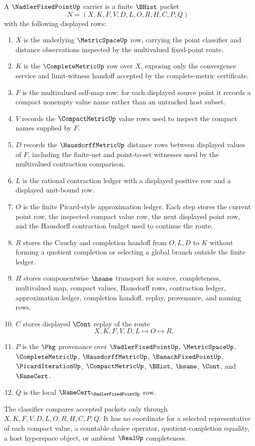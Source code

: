 \begin{definition}\label{def:nadler-fixed-point-carrier}
A $\NadlerFixedPointUp$ carrier is a finite $\BHist$ packet
$$
N=(X,K,F,V,D,L,O,R,H,C,P,Q)
$$
with the following displayed rows:
\begin{enumerate}
\item $X$ is the underlying $\MetricSpaceUp$ row, carrying the point classifier and distance observations inspected by the multivalued fixed-point route.
\item $K$ is the $\CompleteMetricUp$ row over $X$, exposing only the convergence service and limit-witness handoff accepted by the complete-metric certificate.
\item $F$ is the multivalued self-map row: for each displayed source point it records a compact nonempty value name rather than an untracked host subset.
\item $V$ records the $\CompactMetricUp$ value rows used to inspect the compact names supplied by $F$.
\item $D$ records the $\HausdorffMetricUp$ distance rows between displayed values of $F$, including the finite-net and point-to-set witnesses used by the multivalued contraction comparison.
\item $L$ is the rational contraction ledger with a displayed positive row and a displayed unit-bound row.
\item $O$ is the finite Picard-style approximation ledger. Each step stores the current point row, the inspected compact value row, the next displayed point row, and the Hausdorff contraction budget used to continue the route.
\item $R$ stores the Cauchy and completion handoff from $O,L,D$ to $K$ without forming a quotient completion or selecting a global branch outside the finite ledger.
\item $H$ stores componentwise $\hsame$ transport for source, completeness, multivalued map, compact values, Hausdorff rows, contraction ledger, approximation ledger, completion handoff, replay, provenance, and naming rows.
\item $C$ stores displayed $\Cont$ replay of the route
$$
X,K,F,V,D,L \longmapsto O \longmapsto R .
$$
\item $P$ is the $\Pkg$ provenance over $\NadlerFixedPointUp$, $\MetricSpaceUp$, $\CompleteMetricUp$, $\HausdorffMetricUp$, $\BanachFixedPointUp$, $\PicardIterationUp$, $\CompactMetricUp$, $\BHist$, $\hsame$, $\Cont$, and $\NameCert$.
\item $Q$ is the local $\NameCert_{\NadlerFixedPointUp}$ row.
\end{enumerate}
The classifier compares accepted packets only through $X,K,F,V,D,L,O,R,H,C,P,Q$. It has no coordinate for a selected representative of each compact value, a countable choice operator, quotient-completion equality, a host hyperspace object, or ambient $\RealUp$ completeness.
\end{definition}

